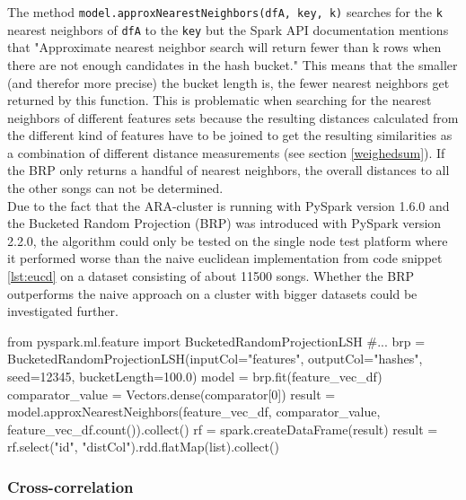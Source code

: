 \noindent The method \lstinline{model.approxNearestNeighbors(dfA, key, k)} searches for the \lstinline{k} nearest neighbors of \lstinline{dfA} to the \lstinline{key} but the Spark API documentation mentions that "Approximate nearest neighbor search will return fewer than k rows when there are not enough candidates in the hash bucket." \cite{lshspark}
This means that the smaller (and therefor more precise) the bucket length is, the fewer nearest neighbors get returned by this function. This is problematic when searching for the nearest neighbors of different features sets because the resulting distances calculated from the different kind of features have to be joined to get the resulting similarities as a combination of different distance measurements (see section \ref{weighedsum}). If the BRP only returns a handful of nearest neighbors, the overall distances to all the other songs can not be determined.\\
\noindent Due to the fact that the ARA-cluster is running with PySpark version 1.6.0 and the Bucketed Random Projection (BRP) was introduced with PySpark version 2.2.0, the algorithm could only be tested on the single node test platform where it performed worse than the naive euclidean implementation from code snippet \ref{lst:eucd} on a dataset consisting of about 11500 songs. Whether the BRP outperforms the naive approach on a cluster with bigger datasets could be investigated further. 

\begin{pythonCode}[frame=single,label={lst:brp},caption={bucketed random projection},captionpos=b]
from pyspark.ml.feature import BucketedRandomProjectionLSH
#...
brp = BucketedRandomProjectionLSH(inputCol="features", outputCol="hashes", seed=12345, bucketLength=100.0)
model = brp.fit(feature_vec_df)
comparator_value = Vectors.dense(comparator[0])
result = model.approxNearestNeighbors(feature_vec_df, comparator_value, feature_vec_df.count()).collect()
rf = spark.createDataFrame(result)
result = rf.select("id", "distCol").rdd.flatMap(list).collect()
\end{pythonCode}

 

\subsubsection{Cross-correlation}

